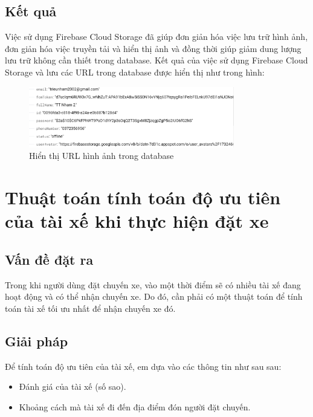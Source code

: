 \documentclass[../DoAn.tex]{subfiles}
\begin{document}
\subsection{Kết quả}
\label{subsection:5.1.3}
Việc sử dụng Firebase Cloud Storage đã giúp đơn giản hóa việc lưu trữ hình ảnh, đơn giản hóa việc truyền tải và hiển thị ảnh và đồng thời giúp giảm dung lượng lưu trữ không cần thiết trong database.
Kết quả của việc sử dụng Firebase Cloud Storage và lưu các URL trong database được hiển thị như trong hình:
\begin{figure}[H]
  \centering
  \includegraphics[width=0.8\textwidth]{Hinhve/Hien_thi_url_anh_firebase.png}
  \caption{Hiển thị URL hình ảnh trong database}
  \label{fig:Hien_thi_url_anh_firebase}
\end{figure}

\section{Thuật toán tính toán độ ưu tiên của tài xế khi thực hiện đặt xe}
\label{section:5.2}

\subsection{Vấn đề đặt ra}
\label{subsection:5.2.1}
Trong khi người dùng đặt chuyến xe, vào một thời điểm sẽ có nhiều tài xế đang hoạt động 
và có thể nhận chuyến xe. Do đó, cần phải có một thuật toán để tính toán tài xế tối ưu nhất để nhận chuyến xe đó.

\subsection{Giải pháp}
\label{subsection:5.2.2}
Để tính toán độ ưu tiên của tài xế, em dựa vào các thông tin như sau sau:
\begin{itemize}
  \item Đánh giá của tài xế (số sao).
  \item Khoảng cách mà tài xế đi đến địa điểm đón người đặt chuyến.
\end{itemize}
\end{document}
